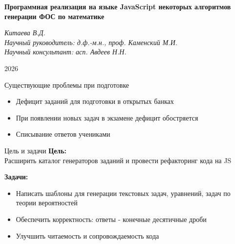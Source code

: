 \documentclass[aspectratio=169,12pt]{beamer}
\begin{document}
\begin{frame}
	\begin{center}
		\vspace{1cm}
		\Large\textcolor{NordBrightBlue}{\textbf{
			Программная реализация на языке JavaScript некоторых алгоритмов генерации ФОС по математике
		}}\\
	\end{center}
	\vspace{0.5cm}
	\large\textcolor{NordBlue}{\textit{%
		Китаева В.Д.
	}}\\
	\large\textcolor{NordBlue}{\textit{Научный руководитель: д.ф.-м.н., проф. Каменский М.И.}}\\
	\large\textcolor{NordBlue}{\textit{Научный консультант: асп. Авдеев Н.Н.}}\\
	\vspace{0.5cm}
	\begin{center}
		2026
	\end{center} 

\end{frame}

\begin{frame}{Существующие проблемы при подготовке}
	\begin{itemize}
		\item Дефицит заданий для подготовки в открытых банках
		\item При появлении новых задач в экзамене дефицит обостряется
		\item Списывание ответов учениками
	\end{itemize}
\end{frame}

\begin{frame}{Цель и задачи}
    \textbf{Цель:}\\
    Расширить каталог генераторов заданий и провести рефакторинг кода на JS
  
    \bigskip
    \textbf{Задачи:}
    \begin{itemize}
      \item Написать шаблоны для генерации текстовых задач, уравнений, задач по теории вероятностей
      \item Обеспечить корректность: ответы - конечные десятичные дроби
      \item Улучшить читаемость и сопровождаемость кода
    \end{itemize}
  \end{frame}
\end{document}

